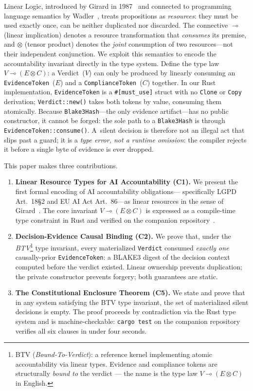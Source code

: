 Linear Logic, introduced by Girard in 1987~\cite{girard1987linear} and
connected to programming language semantics by Wadler~\cite{wadler1991linear},
treats propositions as \emph{resources}: they must be used exactly once,
can be neither duplicated nor discarded.
The connective $\multimap$ (linear implication) denotes a resource transformation
that \emph{consumes} its premise, and $\otimes$ (tensor product) denotes the
\emph{joint} consumption of two resources---not their independent conjunction.
We exploit this semantics to encode the accountability invariant directly
in the type system.
Define the type law $V \multimap (E \otimes C)$:
a Verdict~($V$) can only be produced by linearly consuming an
\texttt{EvidenceToken}~($E$) and a \texttt{ComplianceToken}~($C$) together.
In our Rust implementation, \texttt{EvidenceToken} is a \texttt{\#[must\_use]}
struct with no \texttt{Clone} or \texttt{Copy} derivation;
\texttt{Verdict::new()} takes both tokens by value, consuming them atomically.
Because \texttt{Blake3Hash}---the only evidence artifact---has no public
constructor, it cannot be forged: the sole path to a \texttt{Blake3Hash}
is through \texttt{EvidenceToken::consume()}.
A~silent decision is therefore not an illegal act that slips past a guard;
it is a \emph{type error, not a runtime omission}:
the compiler rejects it before a single byte of evidence is ever dropped.

This paper makes three contributions.
\begin{enumerate}
  \item \textbf{Linear Resource Types for AI Accountability (C1).}
    We present the first formal encoding of AI accountability obligations---
    specifically LGPD Art.~18\S2 and EU AI Act Art.~86---as linear resources
    in the sense of Girard~\cite{girard1987linear}.
    The core invariant $V \multimap (E \otimes C)$ is expressed as a
    compile-time type constraint in Rust and verified on the companion
    repository~\cite{soares2026a, soares2026b}.

  \item \textbf{Decision-Evidence Causal Binding (C2).}
    We prove that, under the \emph{BTV}\footnote{BTV (\textit{Bound-To-Verdict}):
    a reference kernel implementing atomic accountability via linear types.
    Evidence and compliance tokens are structurally \emph{bound to} the
    verdict --- the name is the type law $V \multimap (E \otimes C)$ in English.}
    type invariant, every materialized
    \texttt{Verdict} consumed \emph{exactly one} causally-prior
    \texttt{EvidenceToken}: a BLAKE3 digest of the decision context
    computed before the verdict existed.
    Linear ownership prevents duplication; the private constructor
    prevents forgery; both guarantees are static.

  \item \textbf{The Constitutional Enclosure Theorem (C5).}
    We state and prove that in any system satisfying the BTV type invariant,
    the set of materialized silent decisions is empty.
    The proof proceeds by contradiction via the Rust type system and is
    machine-checkable: \texttt{cargo test} on the companion repository
    verifies all six clauses in under four seconds.\
\end{enumerate}

